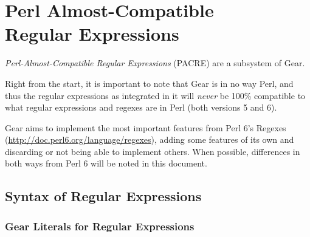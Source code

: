 
\chapter[Perl Almost-Compatible Regular Expressions]{Perl Almost-Compatible\\ Regular Expressions}
\label{sec:pacre}

\minitoc

\newpage





{\em Perl-Almost-Compatible Regular Expressions} (PACRE) are a subsystem of Gear. 

Right from the start, it is important to note that Gear is in no way Perl, and thus the regular expressions as integrated in it will {\em never} be 100\% compatible to what regular expressions and regexes are in Perl (both versions 5 and 6). 

Gear aims to implement the most important features from Perl 6's Regexes (\url{http://doc.perl6.org/language/regexes}), adding some features of its own and discarding or not being able to implement others. When possible, differences in both ways from Perl 6 will be noted in this document. 





\section{Syntax of Regular Expressions} 
\label{sec:syntax-of-regexps}







\subsection{Gear Literals for Regular Expressions}
\label{sec:literals-for-regexps}

